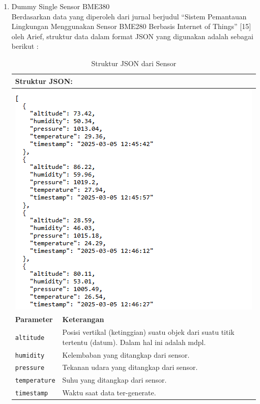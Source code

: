 \begin{enumerate}[label={\alph*.}]
	\item Dummy Single Sensor BME380 \\
	Berdasarkan data yang diperoleh dari jurnal berjudul “Sistem Pemantauan Lingkungan Menggunakan Sensor BME280 Berbasis Internet of Things” [15] oleh Arief, struktur data dalam format JSON yang digunakan adalah sebagai berikut : 
	\pagebreak
	
	\begin{longtable}{|p{.35\linewidth}|p{.60\linewidth}|}
		\caption{Struktur JSON dari Sensor}
		\label{tab:json_sensor} \\  
		\hline
		\multicolumn{2}{|l|}{\textbf{Struktur JSON:}} \\ \hline
		\multicolumn{2}{|c|}{%
			\includegraphics[width=0.8\linewidth, margin=5pt 10pt 5pt 10pt ]{gambar/Metodologi/StrukturJson.png}
		} \\ \hline
		\textbf{Parameter} & \textbf{Keterangan} \\ \hline
		\texttt{altitude} & Posisi vertikal (ketinggian) suatu objek dari suatu titik tertentu (datum). Dalam hal ini adalah mdpl. \\ \hline
		\texttt{humidity} & Kelembaban yang ditangkap dari sensor. \\ \hline
		\texttt{pressure} & Tekanan udara yang ditangkap dari sensor. \\ \hline
		\texttt{temperature} & Suhu yang ditangkap dari sensor. \\ \hline
		\texttt{timestamp} & Waktu saat data ter-generate. \\ \hline
	\end{longtable}
	

\end{enumerate}
